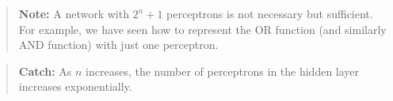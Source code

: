 \begin{quote}
    \textbf{Note:} A network with \( 2^n + 1 \) perceptrons is not necessary but sufficient. For example, we have seen how to represent the OR function (and similarly AND function)    with just one perceptron.
\end{quote}

\begin{quote}
    \textbf{Catch:} As \( n \) increases, the number of perceptrons in the hidden layer increases exponentially.
\end{quote}